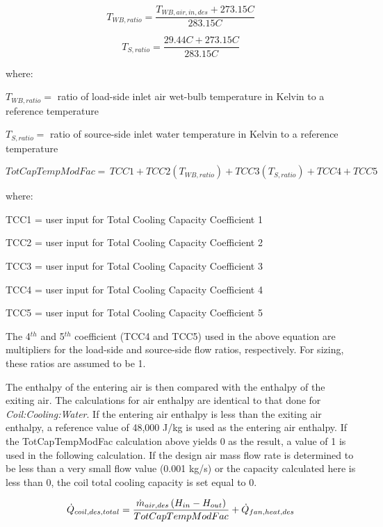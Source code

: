 \begin{equation}
  T_{WB,ratio} = \frac{T_{WB,air,in,des}+273.15C}{283.15C}
\end{equation}

\begin{equation}
  T_{S,ratio} = \frac{29.44C+273.15C}{283.15C}
\end{equation}

where:

$T_{WB,ratio} = $ ratio of load-side inlet air wet-bulb temperature in Kelvin to a reference temperature

$T_{S,ratio} = $ ratio of source-side inlet water temperature in Kelvin to a reference temperature

\begin{equation}
TotCapTempModFac = \,TCC1 + TCC2\left( {{T_{WB,ratio}}} \right) + TCC3\left( {{T_{S,ratio}}} \right) + TCC4 + TCC5
\end{equation}

where:

TCC1 = user input for Total Cooling Capacity Coefficient 1

TCC2 = user input for Total Cooling Capacity Coefficient 2

TCC3 = user input for Total Cooling Capacity Coefficient 3

TCC4 = user input for Total Cooling Capacity Coefficient 4

TCC5 = user input for Total Cooling Capacity Coefficient 5


The 4\(^{th}\) and 5\(^{th}\) coefficient (TCC4 and TCC5) used in the above equation are multipliers for the load-side and source-side flow ratios, respectively. For sizing, these ratios are assumed to be 1.

The enthalpy of the entering air is then compared with the enthalpy of the exiting air. The calculations for air enthalpy are identical to that done for \emph{Coil:Cooling:Water}. If the entering air enthalpy is less than the exiting air enthalpy, a reference value of 48,000 J/kg is used as the entering air enthalpy. If the TotCapTempModFac calculation above yields 0 as the result, a value of 1 is used in the following calculation. If the design air mass flow rate is determined to be less than a very small flow value (0.001 kg/s) or the capacity calculated here is less than 0, the coil total cooling capacity is set equal to 0.

\begin{equation}
  \dot{Q}_{coil,des,total}   = \frac{\dot{m}_{air,des}\left(H_{in}-H_{out}\right)}{TotCapTempModFac} + \dot{Q}_{fan,heat,des}
\end{equation}


